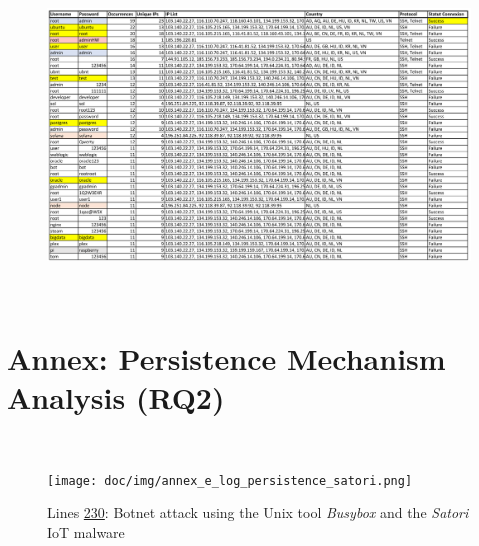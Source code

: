 \

\begin{figure}[h!]
    \centering
    \label{annex:log-credential2}  
    \includegraphics[angle=90, height=0.95\textheight, keepaspectratio]{doc/img/annex_d_credentials2.png}
\end{figure}
\
\

\newpage

\section{Annex: Persistence Mechanism Analysis (RQ2)}  
\label{annex:log-persistence1}  
\

\begin{figure}[h!]
    \centering
    \texttt{[image: doc/img/annex\_e\_log\_persistence\_satori.png]}
    \caption*{Lines \href{https://github.com/nottoBD/netsec-honeypot/blob/master/log/cowrie.json.2025-06-11}{230}: Botnet attack  using the Unix tool \textit{Busybox} and the \textit{Satori} IoT malware} 
\end{figure}


